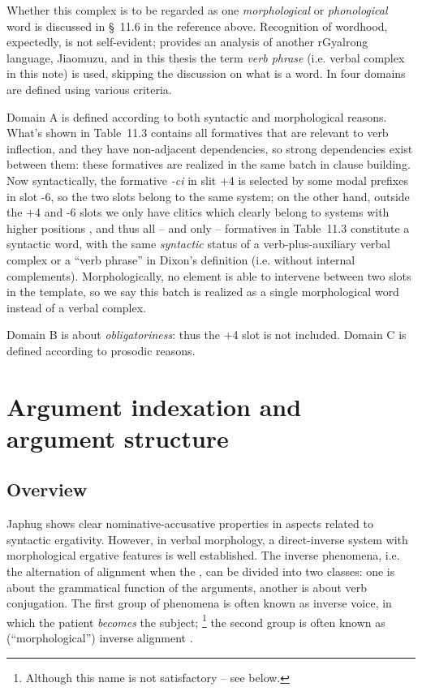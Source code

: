 \documentclass[a4paper, oneside, 12pt]{report}
\newcommand*{\citesec}[1]{\S~{#1}}
\newcommand*{\citetable}[1]{Table~{#1}}
\newcommand*{\term}[1]{\emph{#1}}
\newcommand{\form}[1]{\emph{#1}}
\begin{document}
Whether this complex is to be regarded as one \emph{morphological} or \emph{phonological} word 
is discussed in \citesec{11.6}
in the reference above.
Recognition of wordhood, expectedly, is not self-evident;
\citet{prins2011web} provides an analysis of another rGyalrong language, Jiaomuzu, 
and in this thesis the term \term{verb phrase} 
(i.e. verbal complex in this note) is used,
skipping the discussion on what is a word.
In \citet[\citetable{11.3}]{jacques2021grammar}
four domains are defined using various criteria.

Domain A is defined according to both syntactic and morphological reasons.
What's shown in 
\citetable{11.3} contains all formatives that are relevant to verb inflection,
and they have non-adjacent dependencies,
so strong dependencies exist between them:
these formatives are realized in the same batch 
in clause building.
Now syntactically, the formative \form{-ci} in slit +4 
is selected by some modal prefixes in slot -6,
so the two slots belong to the same system;
on the other hand, outside the +4 and -6 slots 
we only have clitics which clearly belong to systems with higher positions
\citep[\citesec{11.6.2}]{jacques2021grammar},
and thus all -- and only -- formatives in \citetable{11.3}
constitute a syntactic word,
with the same \emph{syntactic} status of a verb-plus-auxiliary verbal complex or a
``verb phrase'' in Dixon's definition (i.e. without internal complements). 
Morphologically, no element is able to intervene 
between two slots in the template, 
so we say this batch is realized as a single morphological word 
instead of a verbal complex.

Domain B is about \emph{obligatoriness}:
thus the +4 slot is not included.
Domain C is defined according to prosodic reasons.

\chapter{Argument indexation and argument structure}

\section{Overview}

Japhug shows clear nominative-accusative properties 
in aspects related to syntactic ergativity.
However, in verbal morphology, 
a direct-inverse system with 
morphological ergative features is well established.
The inverse phenomena, i.e. 
the alternation of alignment 
when the , can be divided into two classes: 
one is about the grammatical function of the arguments, 
another is about verb conjugation.
The first group of phenomena is often known as  
inverse voice, 
in which the patient \emph{becomes} the subject;%
\footnote{
    Although this name is not satisfactory -- see below.
}
the second group is often known as 
(``morphological'') inverse alignment
\citep{oxford2023tale}.
\end{document}

